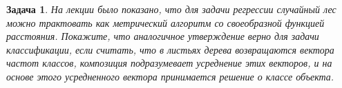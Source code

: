 \documentclass[12pt,fleqn]{article}
\newtheorem{esProblem}{Задача}
\begin{document}
\begin{esProblem}
	На лекции было показано, что для задачи регрессии случайный лес можно трактовать как метрический алгоритм со своеобразной функцией расстояния. Покажите, что аналогичное утверждение верно для задачи классификации, если считать, что в листьях дерева возвращаются вектора частот классов, композиция подразумевает усреднение этих векторов, и на основе этого усредненного вектора принимается решение о классе объекта.
	
\end{esProblem}
\end{document}
